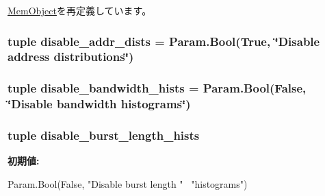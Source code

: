 \hyperlink{classMemObject_1_1MemObject_a17da7064bc5c518791f0c891eff05fda}{MemObject}を再定義しています。\hypertarget{classCommMonitor_1_1CommMonitor_aa2592e96f141d2bc3faf83dc31516d76}{
\subsubsection[{disable\_\-addr\_\-dists}]{\setlength{\rightskip}{0pt plus 5cm}tuple {\bf disable\_\-addr\_\-dists} = Param.Bool(True, \char`\"{}Disable address distributions\char`\"{})}}
\label{classCommMonitor_1_1CommMonitor_aa2592e96f141d2bc3faf83dc31516d76}
\hypertarget{classCommMonitor_1_1CommMonitor_a0f374644d3dd8b1fc3f15eb3d0601e75}{
\subsubsection[{disable\_\-bandwidth\_\-hists}]{\setlength{\rightskip}{0pt plus 5cm}tuple {\bf disable\_\-bandwidth\_\-hists} = Param.Bool(False, \char`\"{}Disable bandwidth histograms\char`\"{})}}
\label{classCommMonitor_1_1CommMonitor_a0f374644d3dd8b1fc3f15eb3d0601e75}
\hypertarget{classCommMonitor_1_1CommMonitor_a0638fa9f0bf0ccb7c7dd54641dc71c7b}{
\subsubsection[{disable\_\-burst\_\-length\_\-hists}]{\setlength{\rightskip}{0pt plus 5cm}tuple {\bf disable\_\-burst\_\-length\_\-hists}}}
\label{classCommMonitor_1_1CommMonitor_a0638fa9f0bf0ccb7c7dd54641dc71c7b}
{\bfseries 初期値:}
\begin{DoxyCode}
Param.Bool(False, "Disable burst length " \
                                                "histograms")
\end{DoxyCode}
